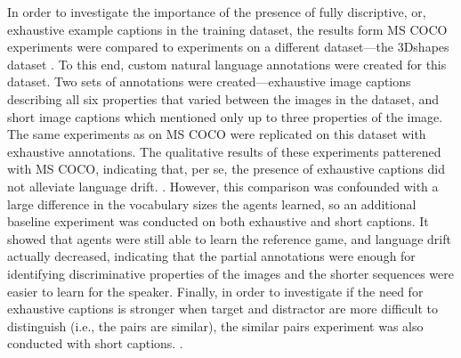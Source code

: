 In order to investigate the importance of the presence of fully discriptive, or, exhaustive example captions in the training dataset, the results form MS COCO experiments were compared to experiments on a different dataset---the 3Dshapes dataset \parencite{burgess20183d}. To this end, custom natural language annotations were created for this dataset. Two sets of annotations were created---exhaustive image captions describing all six properties that varied between the images in the dataset, and short image captions which mentioned only up to three properties of the image.
The same experiments as on MS COCO were replicated on this dataset with exhaustive annotations. The qualitative results of these experiments patterened with MS COCO, indicating that, per se, the presence of exhaustive captions did not alleviate language drift. . However, this comparison was confounded with a large difference in the vocabulary sizes the agents learned, so an additional baseline experiment was conducted on both exhaustive and short captions. It showed that agents were still able to learn the reference game, and language drift actually decreased, indicating that the partial annotations were enough for identifying discriminative properties of the images and the shorter sequences were easier to learn for the speaker. Finally, in order to investigate if the need for exhaustive captions is stronger when target and distractor are more difficult to distinguish (i.e., the pairs are similar), the similar pairs experiment was also conducted with short captions. .

